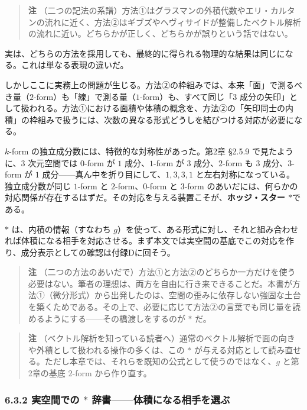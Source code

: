 \documentclass[a4paper,12pt,openany]{book}
\begin{document}
\begin{quote}
\textbf{注}
（二つの記法の系譜）方法①はグラスマンの外積代数やエリ・カルタンの流れに近く、方法②はギブズやヘヴィサイドが整備したベクトル解析の流れに近い。どちらかが正しく、どちらかが誤りという話ではない。
\end{quote}

実は、どちらの方法を採用しても、最終的に得られる物理的な結果は同じになる。これは単なる表現の違いだ。

しかしここに実務上の問題が生じる。方法②の枠組みでは、本来「面」で測るべき量（\(2\)-form）も「線」で測る量（\(1\)-form）も、すべて同じ「\(3\)
成分の矢印」として扱われる。方法①における面積や体積の概念を、方法②の「矢印同士の内積」の枠組みで扱うには、次数の異なる形式どうしを結びつける対応が必要になる。

\(k\)-form の独立成分数には、特徴的な対称性があった。第2章 §2.5.9
で見たように、\(3\) 次元空間では \(0\)-form が \(1\) 成分、\(1\)-form が
\(3\) 成分、\(2\)-form も \(3\) 成分、\(3\)-form が \(1\)
成分——真ん中を折り目にして、\(1, 3, 3, 1\)
と左右対称になっている。独立成分数が同じ \(1\)-form と
\(2\)-form、\(0\)-form と \(3\)-form
のあいだには、何らかの対応関係が存在するはずだ。その対応を与える装置こそが、\textbf{ホッジ・スター $\ast$}である。

\(\ast\) は、内積の情報（すなわち
\(g\)）を使って、ある形式に対し、それと組み合わせれば体積になる相手を対応させる。まず本文では実空間の基底でこの対応を作り、成分表示としての確認は付録Dに回そう。

\begin{quote}
\textbf{注}
（二つの方法のあいだで）方法①と方法②のどちらか一方だけを使う必要はない。筆者の理想は、両方を自由に行き来できることだ。本書が方法①（微分形式）から出発したのは、空間の歪みに依存しない強固な土台を築くためである。その上で、必要に応じて方法②の言葉でも同じ量を読めるようにする——その橋渡しをするのが
\(\ast\) だ。
\end{quote}

\begin{quote}
\textbf{注}
（ベクトル解析を知っている読者へ）通常のベクトル解析で面の向きや外積として扱われる操作の多くは、この
\(\ast\)
が与える対応として読み直せる。ただし本章では、それらを既知の公式として使うのではなく、\(g\)
と第2章の基底 \(2\)-form から作り直す。
\end{quote}

\hypertarget{ux5b9fux7a7aux9593ux3067ux306e-ast-ux8f9eux66f8ux4f53ux7a4dux306bux306aux308bux76f8ux624bux3092ux9078ux3076}{%
\subsubsection{\texorpdfstring{6.3.2 実空間での \(\ast\)
辞書——体積になる相手を選ぶ}{6.3.2 実空間での \textbackslash ast 辞書——体積になる相手を選ぶ}}\label{ux5b9fux7a7aux9593ux3067ux306e-ast-ux8f9eux66f8ux4f53ux7a4dux306bux306aux308bux76f8ux624bux3092ux9078ux3076}}
\end{document}
